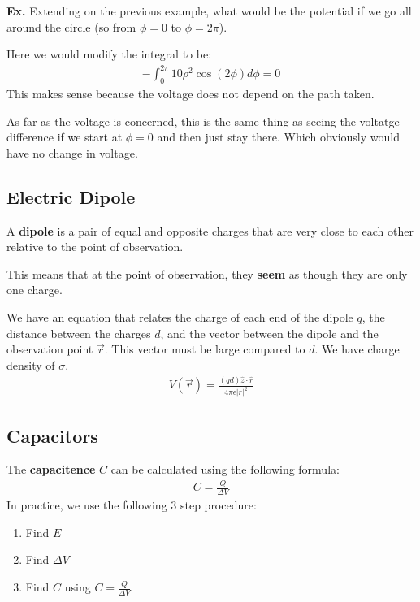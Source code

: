 \documentclass[12pt,letterpaper]{article} \usepackage{amsmath} \usepackage{graphicx} \usepackage[margin=1in]{geometry} \usepackage{longtable}  \usepackage{amssymb}
\begin{document}
	\begin{mdframed}
		\textbf{Ex. }Extending on the previous example, what would be the potential if we go all around the circle (so from $\phi = 0$ to $\phi = 2\pi$).
		
		Here we would modify the integral to be:
		\begin{align*}
			-\int^{2\pi}_0 10\rho^2 \cos(2\phi) d\phi = 0
		\end{align*}
		This makes sense because the voltage does not depend on the path taken. 
		
		As far as the voltage is concerned, this is the same thing as seeing the voltatge difference if we start at $\phi=0$ and then just stay there. Which obviously would have no change in voltage. 
	\end{mdframed}

	\subsection{Electric Dipole}
	A \textbf{dipole} is a pair of equal and opposite charges that are very close to each other relative to the point of observation.
	
	This means that at the point of observation, they \textbf{seem} as though they are only one charge. 
	
	We have an equation that relates the charge of each end of the dipole $q$, the distance between the charges $d$, and the vector between the dipole and the observation point $\vec r$. This vector must be large compared to $d$. We have charge density of $\sigma$. 
	\begin{align*}
		V(\vec r) = \frac{(qd) \hat z \cdot \hat r}{4\pi \epsilon |r|^2}
	\end{align*}

	\subsection{Capacitors}
	The \textbf{capacitence} $C$ can be calculated using the following formula:
	\begin{align*}
		C=\frac{Q}{\Delta V}
	\end{align*}
	In practice, we use the following 3 step procedure:
	\begin{enumerate}[noitemsep]
		\item Find $E$
		\item Find $\Delta V$
		\item Find $C$ using $C=\frac{Q}{\Delta V} $
	\end{enumerate}
\end{document}
